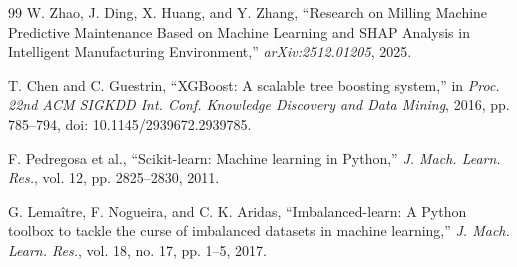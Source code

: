 \documentclass[conference]{IEEEtran}
\begin{document}
\begin{thebibliography}{99}
W. Zhao, J. Ding, X. Huang, and Y. Zhang, ``Research on Milling Machine Predictive Maintenance Based on Machine Learning and SHAP Analysis in Intelligent Manufacturing Environment,'' \textit{arXiv:2512.01205}, 2025.

T. Chen and C. Guestrin, ``XGBoost: A scalable tree boosting system,'' in \textit{Proc. 22nd ACM SIGKDD Int. Conf. Knowledge Discovery and Data Mining}, 2016, pp. 785--794, doi: 10.1145/2939672.2939785.

F. Pedregosa et al., ``Scikit-learn: Machine learning in Python,'' \textit{J. Mach. Learn. Res.}, vol. 12, pp. 2825--2830, 2011.

G. Lemaître, F. Nogueira, and C. K. Aridas, ``Imbalanced-learn: A Python toolbox to tackle the curse of imbalanced datasets in machine learning,'' \textit{J. Mach. Learn. Res.}, vol. 18, no. 17, pp. 1--5, 2017.
\end{thebibliography}
\end{document}
